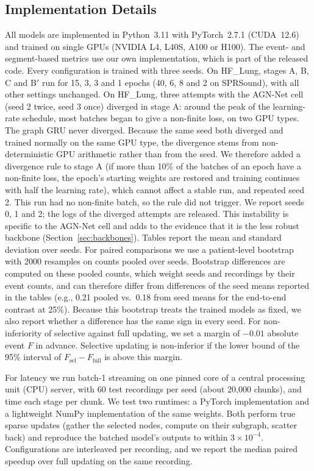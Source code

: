 \subsection{Implementation Details}
\label{sec:impl}
All models are implemented in Python~3.11 with PyTorch~2.7.1 (CUDA~12.6) and trained on single GPUs (NVIDIA L4, L40S, A100 or H100). The event- and segment-based metrics use our own implementation, which is part of the released code. Every configuration is trained with three seeds. On HF\_Lung, stages A, B, C and B$'$ run for 15, 3, 3 and 1 epochs (40, 6, 8 and 2 on SPRSound), with all other settings unchanged. On HF\_Lung, three attempts with the AGN-Net cell (seed 2 twice, seed 3 once) diverged in stage A: around the peak of the learning-rate schedule, most batches began to give a non-finite loss, on two GPU types. The graph GRU never diverged. Because the same seed both diverged and trained normally on the same GPU type, the divergence stems from non-deterministic GPU arithmetic rather than from the seed. We therefore added a divergence rule to stage A (if more than 10\% of the batches of an epoch have a non-finite loss, the epoch's starting weights are restored and training continues with half the learning rate), which cannot affect a stable run, and repeated seed 2. This run had no non-finite batch, so the rule did not trigger. We report seeds 0, 1 and 2; the logs of the diverged attempts are released. This instability is specific to the AGN-Net cell and adds to the evidence that it is the less robust backbone (Section~\ref{sec:backbones}). Tables report the mean and standard deviation over seeds. For paired comparisons we use a patient-level bootstrap with 2000 resamples on counts pooled over seeds. Bootstrap differences are computed on these pooled counts, which weight seeds and recordings by their event counts, and can therefore differ from differences of the seed means reported in the tables (e.g., 0.21 pooled vs.\ 0.18 from seed means for the end-to-end contrast at 25\%). Because this bootstrap treats the trained models as fixed, we also report whether a difference has the same sign in every seed. For non-inferiority of selective against full updating, we set a margin of $-0.01$ absolute event $F$ in advance. Selective updating is non-inferior if the lower bound of the 95\% interval of $F_{\mathrm{sel}}-F_{\mathrm{full}}$ is above this margin.

For latency we run batch-1 streaming on one pinned core of a central processing unit (CPU) server, with 60 test recordings per seed (about 20{,}000 chunks), and time each stage per chunk. We test two runtimes: a PyTorch implementation and a lightweight NumPy implementation of the same weights. Both perform true sparse updates (gather the selected nodes, compute on their subgraph, scatter back) and reproduce the batched model's outputs to within $3\times10^{-4}$. Configurations are interleaved per recording, and we report the median paired speedup over full updating on the same recording.


